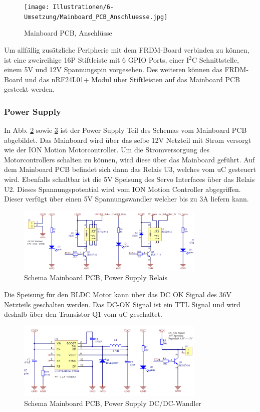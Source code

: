 \begin{figure}[H]
	\texttt{[image: Illustrationen/6-Umsetzung/Mainboard\_PCB\_Anschluesse.jpg]}
	\caption{Mainboard PCB, Anschlüsse}
	\label{fig:Mainboard_3D}
\end{figure}

Um allfällig zusätzliche Peripherie mit dem FRDM-Board verbinden zu können, ist eine zweireihige 16P Stiftleiste mit 6 GPIO Ports, einer I$^{2}$C Schnittstelle, einem 5V und 12V Spannungspin vorgesehen. Des weiteren können das FRDM-Board und das nRF24L01+ Modul über Stiftleisten auf das Mainboard PCB gesteckt werden.

\subsubsection{Power Supply}
In Abb. \ref{fig:Schema_Mainboard_PowerSupply_1} sowie \ref{fig:Schema_Mainboard_PowerSupply_2} ist der Power Supply Teil des Schemas vom Mainboard PCB abgebildet. Das Mainboard wird über das selbe 12V Netzteil mit Strom versorgt wie der ION Motion Motorcontroller. Um die Stromversorgung des Motorcontrollers schalten zu können, wird diese über das Mainboard geführt. Auf dem Mainboard PCB befindet sich dann das Relais U3, welches vom uC gesteuert wird. Ebenfalls schaltbar ist die 5V Speisung des Servo Interfaces über das Relais U2. Dieses Spannungspotential wird vom ION Motion Controller abgegriffen. Dieser verfügt über einen 5V Spannungswandler welcher bis zu 3A liefern kann. 

\begin{figure}[H]
	\includegraphics[width=0.8\textwidth]{Illustrationen/6-Umsetzung/Schema_Mainboard_PowerSupply_1.png}
	\caption{Schema Mainboard PCB, Power Supply Relais}
	\label{fig:Schema_Mainboard_PowerSupply_1}
\end{figure}

Die Speisung für den BLDC Motor kann über das DC$\_$OK Signal des 36V Netzteils geschalten werden. Das DC-OK Signal ist ein TTL Signal und wird deshalb über den Transistor Q1 vom uC geschaltet.

\begin{figure}[H]
	\includegraphics[width=0.8\textwidth]{Illustrationen/6-Umsetzung/Schema_Mainboard_PowerSupply_2.png}
	\caption{Schema Mainboard PCB, Power Supply DC/DC-Wandler}
	\label{fig:Schema_Mainboard_PowerSupply_2}
\end{figure}


